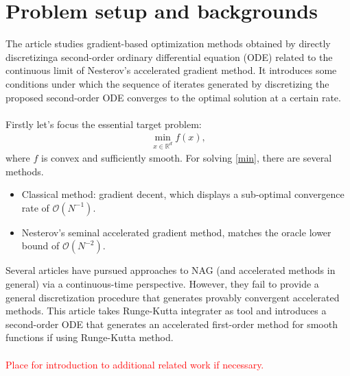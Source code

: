 

\section{Problem setup and backgrounds}

The article studies gradient-based optimization methods obtained by directly
discretizinga second-order ordinary differential equation (ODE) related to the
continuous limit of Nesterov's accelerated gradient method. It introduces some
conditions under which the sequence of iterates generated by discretizing the
proposed second-order ODE converges to the optimal solution at a certain rate.\\\\
Firstly let's focus the essential target problem:
\begin{align}\label{min}
  \mathop{\mathrm{min}}\limits_{x \in \mathbb{R}^{d}} f(x),
\end{align}
where $f$ is convex and sufficiently smooth. For solving \ref{min}, there are several
methods.
\begin{itemize}
  \item Classical method: gradient decent, which displays a sub-optimal convergence rate of $\mathcal{O}(N^{-1})$.
  \item Nesterov's seminal accelerated gradient method, matches the oracle lower bound of $\mathcal{O}(N^{-2})$.
\end{itemize}
Several articles have pursued approaches to NAG (and accelerated methods in general)
via a continuous-time perspective. However, they fail to provide a general
discretization procedure that generates provably convergent accelerated methods.
This article takes Runge-Kutta integrater as tool and introduces a second-order ODE
that generates an accelerated first-order method for smooth functions if using
Runge-Kutta method.\\\\
\textcolor{red}{Place for introduction to additional related work if necessary.}

